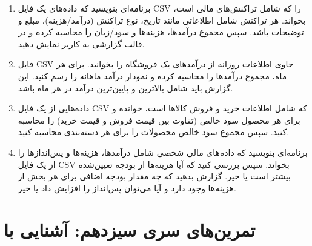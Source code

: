 \documentclass[b5paper,12pt]{article}
\begin{document}
\begin{enumerate}
		\item برنامه‌ای بنویسید که داده‌های یک فایل CSV را که شامل تراکنش‌های مالی است، بخواند. هر تراکنش شامل اطلاعاتی مانند تاریخ، نوع تراکنش (درآمد/هزینه)، مبلغ و توضیحات باشد. سپس مجموع درآمدها، هزینه‌ها و سود/زیان را محاسبه کرده و در قالب گزارشی به کاربر نمایش دهید.
		\item فایل CSV حاوی اطلاعات روزانه از درآمدهای یک فروشگاه را بخوانید. برای هر ماه، مجموع درآمدها را محاسبه کرده و نمودار درآمد ماهانه را رسم کنید. این گزارش باید شامل بالاترین و پایین‌ترین درآمد در هر ماه باشد.
		\item داده‌هایی از یک فایل CSV که شامل اطلاعات خرید و فروش کالاها است، خوانده و برای هر محصول سود خالص (تفاوت بین قیمت فروش و قیمت خرید) را محاسبه کنید. سپس مجموع سود خالص محصولات را برای هر دسته‌بندی محاسبه کنید.
		\item برنامه‌ای بنویسید که داده‌های مالی شخصی شامل درآمدها، هزینه‌ها و پس‌اندازها را از یک فایل CSV بخواند. سپس بررسی کنید که آیا هزینه‌ها از بودجه تعیین‌شده بیشتر است یا خیر. گزارش بدهید که چه مقدار بودجه اضافی برای هر بخش از هزینه‌ها وجود دارد و آیا می‌توان پس‌انداز را افزایش داد یا خیر.
	\end{enumerate}
	
	\newpage
	\section*{تمرین‌های سری سیزدهم: آشنایی با}
	
\end{document}
